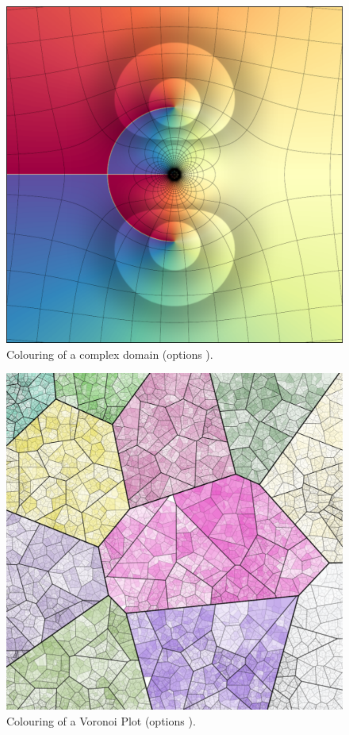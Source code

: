 \documentclass[minted, draw, cover = contour]{../tex/hebdomon}
\begin{document}
\begin{figure}[ht]
	\centering
	\includegraphics[width=0.6\pagewidth]{../coverArts/DomainColouring.pdf}
	\caption{Colouring of a complex domain (options ).}
\end{figure}

\newpage

\begin{figure}[ht]
	\centering
	\includegraphics[width=0.6\pagewidth]{../coverArts/RecursiveVoronoi.pdf}
	\caption{Colouring of a Voronoi Plot (options ).}
\end{figure}
\end{document}
